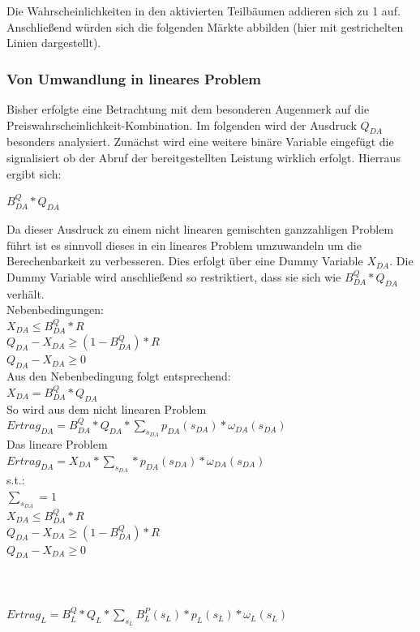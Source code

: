 \documentclass{article}
\begin{document}
Die Wahrscheinlichkeiten in den aktivierten Teilbäumen addieren sich zu 1 auf.
Anschließend würden sich die folgenden Märkte abbilden (hier mit gestrichelten Linien dargestellt).\\

\subsubsection{Von Umwandlung in lineares Problem}
Bisher erfolgte eine Betrachtung mit dem besonderen Augenmerk auf die Preiswahrscheinlichkeit-Kombination.
Im folgenden wird der Ausdruck $Q_{DA}$ besonders analysiert. Zunächst wird eine weitere binäre Variable eingefügt die signalisiert ob der Abruf der bereitgestellten Leistung wirklich erfolgt.
Hierraus ergibt sich:

    $B^Q_{DA} * Q_{DA}$ 

Da dieser Ausdruck zu einem nicht linearen gemischten ganzzahligen Problem führt ist es sinnvoll dieses in ein lineares Problem umzuwandeln  um die Berechenbarkeit zu verbesseren.
Dies erfolgt über eine Dummy Variable $X_{DA}$. Die Dummy Variable wird anschließend so restriktiert, dass sie sich wie $B^Q_{DA} * Q_{DA}$ verhält.
\\
Nebenbedingungen:\\
$X_{DA} \leq B^Q_{DA} * R$\\
$Q_{DA} - X_{DA} \geq (1 - B^Q_{DA}) * R$\\
$Q_{DA} - X_{DA} \geq 0 $\\
Aus den Nebenbedingung folgt entsprechend:\\
$X_{DA} = B^Q_{DA} * Q_{DA}$\\

So wird aus dem nicht linearen Problem\\
$Ertrag_{DA} = B^Q_{DA} * Q_{DA} * \sum_{s_{DA}}  p_{DA}(s_{DA}) * \omega_{DA}(s_{DA})  $\\
Das lineare Problem\\
$Ertrag_{DA} = X_{DA} * \sum_{s_{DA}} * p_{DA}(s_{DA}) * \omega_{DA}(s_{DA})  $\\
s.t.:\\
$\sum_{s_{DA}} = 1$\\
$X_{DA} \leq B^Q_{DA} * R$\\
$Q_{DA} - X_{DA} \geq (1 - B^Q_{DA}) * R$\\
$Q_{DA} - X_{DA} \geq 0 $\\

\\
\\
\\
$Ertrag_{L} = B^Q_{L} * Q_{L} * \sum_{s_{L}} B^P_{L}(s_{L}) * p_{L}(s_{L}) * \omega_{L}(s_{L})  $\\
\end{document}
